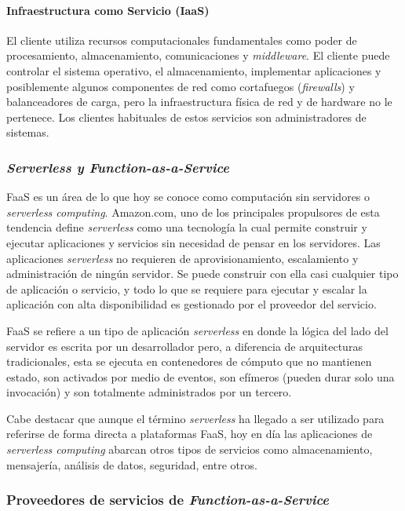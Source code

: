\paragraph{Infraestructura como Servicio (IaaS)}
El cliente utiliza recursos computacionales fundamentales como poder de procesamiento, almacenamiento, comunicaciones y \emph{middleware}. El cliente puede controlar el sistema operativo, el almacenamiento, implementar aplicaciones y posiblemente algunos componentes de red como cortafuegos (\emph{firewalls}) y balanceadores de carga, pero la infraestructura física de red y de hardware no le pertenece. Los clientes habituales de estos servicios son administradores de sistemas.

\subsubsection{\emph{Serverless y Function-as-a-Service}}
FaaS es un área de lo que hoy se conoce como computación sin servidores o \emph{serverless computing}. Amazon.com, uno de los principales propulsores de esta tendencia define \emph{serverless} como una tecnología la cual permite construir y ejecutar aplicaciones y servicios sin necesidad de pensar en los servidores. Las aplicaciones \emph{serverless} no requieren de aprovisionamiento, escalamiento y administración de ningún servidor. Se puede construir con ella casi cualquier tipo de aplicación o servicio, y todo lo que se requiere para ejecutar y escalar la aplicación con alta disponibilidad es gestionado por el proveedor del servicio\cite{amazon:serverless-definition}. 

FaaS se refiere a un tipo de aplicación \emph{serverless} en donde la lógica del lado del servidor es escrita por un desarrollador pero, a diferencia de arquitecturas tradicionales, esta se ejecuta en contenedores de cómputo que no mantienen estado, son activados por medio de eventos, son efímeros (pueden durar solo una invocación) y son totalmente administrados por un tercero\cite{mike-roberts-serverless}.

Cabe destacar que aunque el término \emph{serverless} ha llegado a ser utilizado para referirse de forma directa a plataformas FaaS, hoy en día las aplicaciones de \emph{serverless computing} abarcan otros tipos de servicios como almacenamiento, mensajería, análisis de datos, seguridad, entre otros.

\subsubsection{Proveedores de servicios de \emph{Function-as-a-Service}} \label{sec:proveedores-faas}

